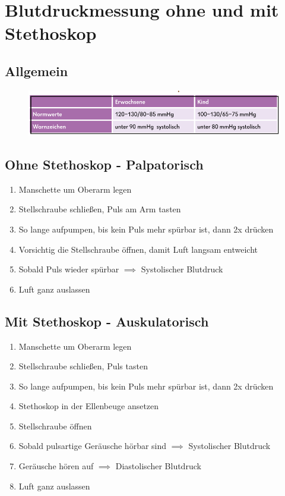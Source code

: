 \chapter{Blutdruckmessung ohne und mit Stethoskop}
\section{Allgemein}
\begin{figure}[H]
    \centering
    \includegraphics[width=\textwidth]{res/blutdruck.png}
\end{figure}

\section{Ohne Stethoskop - Palpatorisch}
\begin{enumerate}
    \item Manschette um Oberarm legen
    \item Stellschraube schließen, Puls am Arm tasten
    \item So lange aufpumpen, bis kein Puls mehr spürbar ist, dann 2x drücken
    \item Vorsichtig die Stellschraube öffnen, damit Luft langsam entweicht
    \item Sobald Puls wieder spürbar $\implies$ Systolischer Blutdruck
    \item Luft ganz auslassen
\end{enumerate}

\section{Mit Stethoskop - Auskulatorisch}
\begin{enumerate}
    \item Manschette um Oberarm legen
    \item Stellschraube schließen, Puls tasten
    \item So lange aufpumpen, bis kein Puls mehr spürbar ist, dann 2x drücken
    \item Stethoskop in der Ellenbeuge ansetzen
    \item Stellschraube öffnen
    \item Sobald pulsartige Geräusche hörbar sind $\implies$ Systolischer Blutdruck
    \item Geräusche hören auf $\implies$ Diastolischer Blutdruck
    \item Luft ganz auslassen
\end{enumerate}
